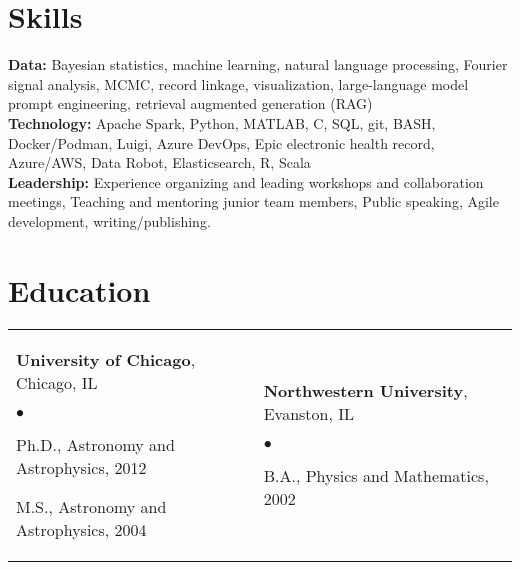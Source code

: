 \documentclass[margin,line, 11pt]{res}
\newenvironment{list2}{
  \begin{list}{$\bullet$}{%
      \setlength{\itemsep}{0in}
      \setlength{\parsep}{0in} \setlength{\parskip}{0in}
      \setlength{\topsep}{0in} \setlength{\partopsep}{0in}
      \setlength{\leftmargin}{0.2in}}}{\end{list}}
\begin{document}
\begin{resume}
\section{Skills}
\textbf{Data:} Bayesian statistics, machine learning, natural language processing, Fourier signal analysis, MCMC, record linkage, visualization, large-language model prompt engineering, retrieval augmented generation (RAG)\\
\textbf{Technology:} Apache Spark, Python, MATLAB, C, SQL, git, BASH, Docker/Podman, Luigi, Azure DevOps, Epic electronic health record, Azure/AWS, Data Robot, Elasticsearch, R, Scala\\
\textbf{Leadership:} Experience organizing and leading workshops and collaboration meetings, Teaching and mentoring junior team members, Public speaking, Agile development, writing/publishing. \\
\vspace*{-7mm}

\section{Education}
\begin{tabular}{@{}p{3in}p{3in}}
  \textbf{University of Chicago}, Chicago, IL
  \begin{list2}
  	\item Ph.D., Astronomy and Astrophysics, 2012
    \item M.S., Astronomy and Astrophysics, 2004
  \end{list2} &
  \textbf{Northwestern University}, Evanston, IL
  \begin{list2}
  	\item B.A., Physics and Mathematics, 2002
  \end{list2} \\
\end{tabular}
\vspace*{-4mm}

\end{resume}
\end{document}
